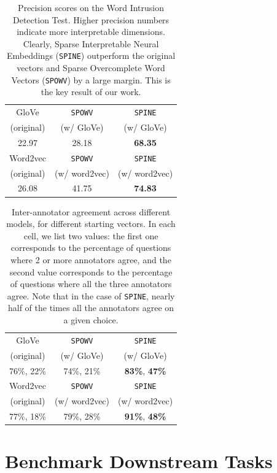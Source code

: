 \documentclass[letterpaper]{article} %
\begin{document}
\begin{table}[t]
\centering
\begin{tabular}{|c|c|c|}\hline
GloVe & \texttt{SPOWV} & \texttt{SPINE}  \\ 
 (original) &  (w/ GloVe) & (w/ GloVe) \\  \hline
 22.97 & 28.18 & {\bf 68.35}  \\ \hline \hline
 Word2vec & \texttt{SPOWV} & \texttt{SPINE} \\
 (original) &  (w/ word2vec) & (w/ word2vec) \\ \hline
26.08 & 41.75 & {\bf 74.83 } \\ \hline
\end{tabular}
\caption{\label{tbl:amt} Precision scores on the Word Intrusion Detection Test. Higher precision numbers indicate more interpretable dimensions. Clearly, Sparse Interpretable Neural Embeddings (\texttt{SPINE}) outperform the original vectors and Sparse Overcomplete Word Vectors (\texttt{SPOWV}) by a large margin. This is the key result of our work.}
\end{table}

\begin{table}[t]
\centering
\begin{tabular}{|c|c|c|}\hline
GloVe & \texttt{SPOWV} & \texttt{SPINE} \\
 (original) &  (w/ GloVe) & (w/ GloVe) \\  \hline
   76\%, 22\% & 74\%, 21\% & {\bf 83\%}, {\bf 47\%}  \\ \hline \hline
 Word2vec & \texttt{SPOWV} & \texttt{SPINE} \\
 (original) &  (w/ word2vec) & (w/ word2vec) \\ \hline
77\%, 18\% & 79\%, 28\% & {\bf 91\%}, {\bf 48\%}  \\ \hline
\end{tabular}
\caption{\label{tbl:iaa} Inter-annotator agreement across different models, for different starting vectors. In each cell, we list two values: the first one corresponds to the percentage of questions where 2 or more annotators agree, and the second value corresponds to the percentage of questions where all the three annotators agree. Note that in the case of \texttt{SPINE}, nearly half of the times all the annotators agree on a given choice.}
\end{table}

\section{Benchmark Downstream Tasks}
\label{sec:benchmark}
\end{document}
